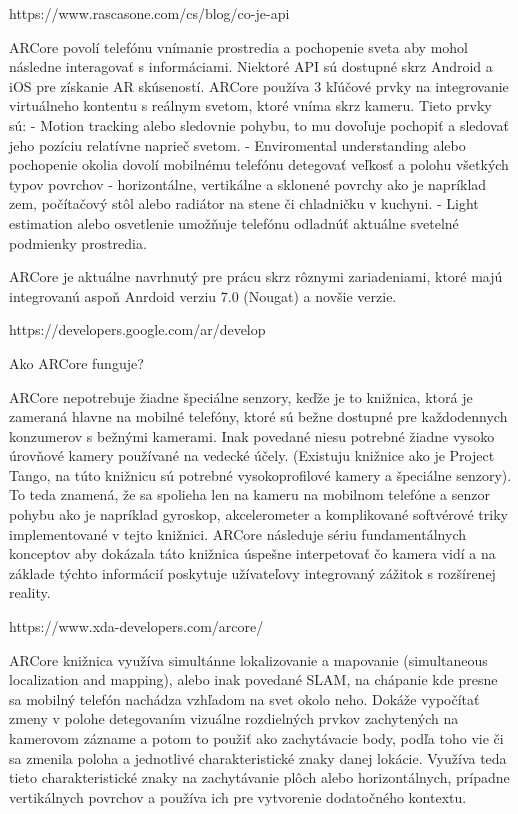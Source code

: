 https://www.rascasone.com/cs/blog/co-je-api

ARCore povolí telefónu vnímanie prostredia a pochopenie sveta aby mohol následne interagovať s informáciami. Niektoré API sú dostupné skrz Android a iOS pre získanie AR skúseností. ARCore používa 3 kľúčové prvky na integrovanie virtuálneho kontentu s reálnym svetom, ktoré vníma skrz kameru. Tieto prvky sú:
- Motion tracking alebo sledovnie pohybu, to mu dovoľuje pochopiť a sledovať jeho pozíciu relatívne naprieč svetom. 
- Enviromental understanding alebo pochopenie okolia dovolí mobilnému telefónu detegovať veľkosť a polohu všetkých typov povrchov - horizontálne, vertikálne a sklonené povrchy ako je napríklad zem, počítačový stôl alebo radiátor na stene či chladničku v kuchyni.
- Light estimation alebo osvetlenie umožňuje telefónu odladnúť aktuálne svetelné podmienky prostredia.

ARCore je aktuálne navrhnutý pre prácu skrz rôznymi zariadeniami, ktoré majú integrovanú aspoň Anrdoid verziu 7.0 (Nougat) a novšie verzie. 

https://developers.google.com/ar/develop

Ako ARCore funguje?

ARCore nepotrebuje žiadne špeciálne senzory, keďže je to knižnica, ktorá je zameraná hlavne na mobilné telefóny, ktoré sú bežne dostupné pre každodennych konzumerov s bežnými kamerami. Inak povedané niesu potrebné žiadne vysoko úrovňové kamery používané na vedecké účely. (Existuju knižnice ako je Project Tango, na túto knižnicu sú potrebné vysokoprofilové kamery a špeciálne senzory). To teda znamená, že sa spolieha len na kameru na mobilnom telefóne a senzor pohybu ako je napríklad gyroskop, akcelerometer a komplikované softvérové triky implementované v tejto knižnici. ARCore následuje sériu fundamentálnych konceptov aby dokázala táto knižnica úspešne interpetovať čo kamera vidí a na základe týchto informácií poskytuje užívateľovy integrovaný zážitok s rozšírenej reality. 

https://www.xda-developers.com/arcore/

ARCore knižnica využíva  simultánne lokalizovanie a mapovanie (simultaneous localization and mapping), alebo inak povedané SLAM, na chápanie kde presne sa mobilný telefón nachádza vzhľadom na svet okolo neho. Dokáže vypočítať zmeny v polohe detegovaním vizuálne rozdielných prvkov zachytených na kamerovom zázname a potom to použiť ako zachytávacie body, podľa toho vie či sa zmenila poloha a jednotlivé charakteristické znaky danej lokácie. Využíva teda tieto charakteristické znaky na zachytávanie plôch alebo horizontálnych, prípadne vertikálnych povrchov a používa ich pre vytvorenie dodatočného kontextu. 

